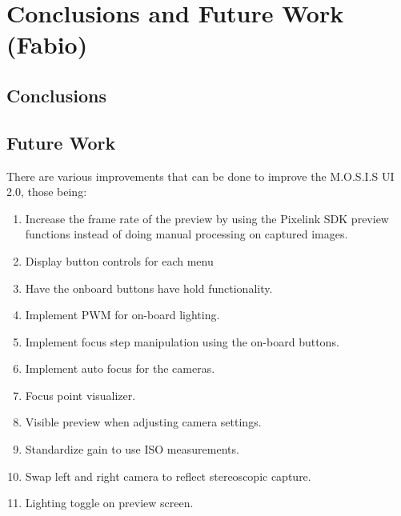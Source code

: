 \section{Conclusions and Future Work (Fabio)}
\subsection{Conclusions}

\subsection{Future Work}
There are various improvements that can be done to improve the M.O.S.I.S UI 2.0, those being:
\begin{enumerate}
	\item Increase the frame rate of the preview by using the Pixelink SDK preview functions instead of doing manual processing on captured images.
	\item Display button controls for each menu
	\item Have the onboard buttons have hold functionality.
	\item Implement PWM for on-board lighting.
	\item Implement focus step manipulation using the on-board buttons.
	\item Implement auto focus for the cameras.
	\item Focus point visualizer.
	\item Visible preview when adjusting camera settings.
	\item Standardize gain to use ISO measurements.
	\item Swap left and right camera to reflect stereoscopic capture.
	\item Lighting toggle on preview screen.
\end{enumerate}

